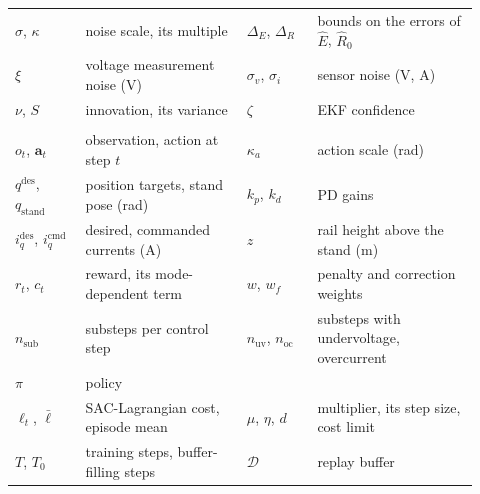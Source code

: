 {\begin{longtable}{@{}>{\raggedright\arraybackslash}p{0.14\linewidth}>{\raggedright\arraybackslash}p{0.32\linewidth}>{\raggedright\arraybackslash}p{0.14\linewidth}>{\raggedright\arraybackslash}p{0.32\linewidth}@{}}
$\sigma$, $\kappa$ & noise scale, its multiple & $\Delta_E$, $\Delta_R$ & bounds on the errors of $\hat E$, $\hat R_0$ \\
$\xi$ & voltage measurement noise (V) & $\sigma_v$, $\sigma_i$ & sensor noise (V, A) \\
$\nu$, $S$ & innovation, its variance & $\zeta$ & EKF confidence \\[3pt]
\multicolumn{4}{@{}l}{\emph{Learning}}\\
$o_t$, $\mathbf a_t$ & observation, action at step $t$ & $\kappa_a$ & action scale (rad) \\
$q^{\mathrm{des}}$, $q_{\mathrm{stand}}$ & position targets, stand pose (rad) & $k_p$, $k_d$ & PD gains \\
$i_q^{\mathrm{des}}$, $i_q^{\mathrm{cmd}}$ & desired, commanded currents (A) & $z$ & rail height above the stand (m) \\
$r_t$, $c_t$ & reward, its mode-dependent term & $w$, $w_f$ & penalty and correction weights \\
$n_{\mathrm{sub}}$ & substeps per control step & $n_{\mathrm{uv}}$, $n_{\mathrm{oc}}$ & substeps with undervoltage, overcurrent \\
$\pi$ & policy & & \\
$\ell_t$, $\bar\ell$ & SAC-Lagrangian cost, episode mean & $\mu$, $\eta$, $d$ & multiplier, its step size, cost limit \\
$T$, $T_0$ & training steps, buffer-filling steps & $\mathcal D$ & replay buffer \\
\end{longtable}}
